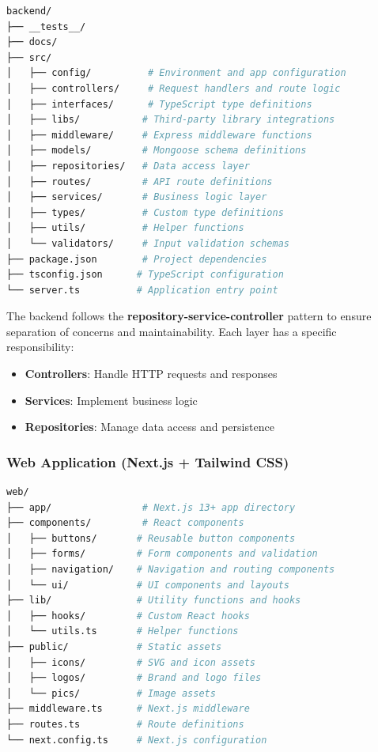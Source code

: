 \begin{lstlisting}[language=bash, caption={Backend Directory Structure (tree -L 2)}]
backend/
├── __tests__/
├── docs/
├── src/
│   ├── config/          # Environment and app configuration
│   ├── controllers/     # Request handlers and route logic
│   ├── interfaces/      # TypeScript type definitions
│   ├── libs/           # Third-party library integrations
│   ├── middleware/     # Express middleware functions
│   ├── models/         # Mongoose schema definitions
│   ├── repositories/   # Data access layer
│   ├── routes/         # API route definitions
│   ├── services/       # Business logic layer
│   ├── types/          # Custom type definitions
│   ├── utils/          # Helper functions
│   └── validators/     # Input validation schemas
├── package.json        # Project dependencies
├── tsconfig.json      # TypeScript configuration
└── server.ts          # Application entry point
\end{lstlisting}

\begin{tcolorbox}[title=Backend Architecture]
The backend follows the \textbf{repository-service-controller} pattern to ensure separation of concerns and maintainability. Each layer has a specific responsibility:
\begin{itemize}
    \item \textbf{Controllers}: Handle HTTP requests and responses
    \item \textbf{Services}: Implement business logic
    \item \textbf{Repositories}: Manage data access and persistence
\end{itemize}
\end{tcolorbox}

\subsubsection{Web Application (Next.js + Tailwind CSS)}

\begin{lstlisting}[language=bash, caption={Web Application Directory Structure (tree -L 2)}]
web/
├── app/                # Next.js 13+ app directory
├── components/         # React components
│   ├── buttons/       # Reusable button components
│   ├── forms/         # Form components and validation
│   ├── navigation/    # Navigation and routing components
│   └── ui/            # UI components and layouts
├── lib/               # Utility functions and hooks
│   ├── hooks/         # Custom React hooks
│   └── utils.ts       # Helper functions
├── public/            # Static assets
│   ├── icons/         # SVG and icon assets
│   ├── logos/         # Brand and logo files
│   └── pics/          # Image assets
├── middleware.ts      # Next.js middleware
├── routes.ts          # Route definitions
└── next.config.ts     # Next.js configuration
\end{lstlisting}

